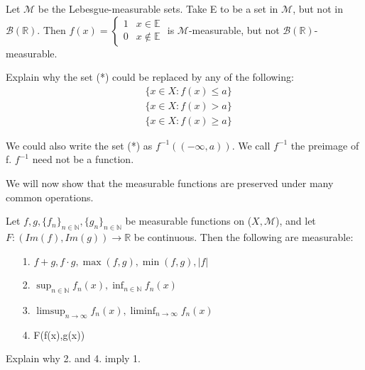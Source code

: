 \documentclass[11pt]{scrartcl}
\begin{document}
\begin{remark}
Let $\mathcal{M}$ be the Lebesgue-measurable sets. Take E to be a set in $\mathcal{M}$, but not in $\mathcal{B}(\mathbb{R})$. Then $f(x) = \begin{cases}
1 & x \in \mathbb{E} \\
0 & x \notin \mathbb{E} 
\end{cases}$ is $\mathcal{M}$-measurable, but not $\mathcal{B}(\mathbb{R})$-measurable.
\end{remark}

\begin{exercise}
Explain why the set (*) could be replaced by any of the following:
\begin{align*}
& \{x\in X : f(x) \leq a\}\\
& \{x\in X : f(x) > a\}\\
& \{x\in X : f(x) \geq a\}
\end{align*}
\end{exercise}

\begin{remark}
We could also write the set (*) as $f^{-1}((-\infty,a))$. We call $f^{-1}$ the preimage of f. $f^{-1}$ need not be a function.
\end{remark}

We will now show that the measurable functions are preserved under many common operations.

\begin{theorem}
Let $f, g,\{f_n\}_{n\in \mathbb{N}},\{g_n\}_{n\in \mathbb{N}}$ be measurable functions on ($X,\mathcal{M}$), and let \\$F: (Im(f),Im(g)) \rightarrow \mathbb{R}$ be continuous. Then the following are measurable:
\begin{itemize}
\item[1.] $f + g, f\cdot g, \max(f,g), \min(f,g), |f|$ 
\item[2.] $\sup_{n\in \mathbb{N}} f_n(x), \inf_{n\in \mathbb{N}} f_n(x)$
\item[3.] $\limsup_{n\rightarrow \infty} f_n(x), \liminf_{n\rightarrow \infty} f_n(x)$
\item[4.] F(f(x),g(x))
\end{itemize}
\end{theorem}

\begin{exercise}
Explain why 2. and 4. imply 1.
\end{exercise}
\end{document}
